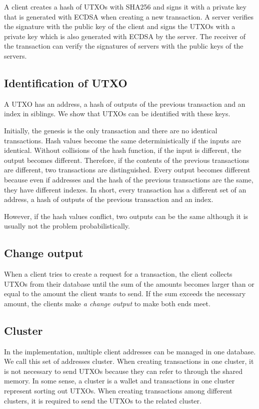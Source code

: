 \documentclass[a4paper, oneside]{discothesis}
\begin{document}
A client creates a hash of UTXOs with SHA256 and signs it with a private key
that is generated with ECDSA when creating a new transaction.
A server verifies the signature with the public key of the client
and signs the UTXOs with a private key which is also generated with ECDSA by the server.
The receiver of the transaction can verify the signatures of servers
with the public keys of the servers.

\subsection{Identification of UTXO}
A UTXO has an address, a hash of outputs of the previous transaction and an index in siblings.
We show that UTXOs can be identified with these keys.

Initially, the genesis is the only transaction and there are no identical transactions.
Hash values become the same deterministically if the inputs are identical.
Without collisions of the hash function, if the input is different, the output becomes different.
Therefore, if the contents of the previous transactions are different,
two transactions are distinguished.
Every output becomes different because even if addresses and the hash
of the previous transactions are the same, they have different indexes.
In short, every transaction has a different set of an address,
a hash of outputs of the previous transaction and an index.

However, if the hash values conflict, two outputs can be the same
although it is usually not the problem probabilistically.


\subsection{Change output}
When a client tries to create a request for a transaction,
the client collects UTXOs from their database until the sum of the amounts
becomes larger than or equal to the amount the client wants to send.
If the sum exceeds the necessary amount, the clients make \emph{a change output}
to make both ends meet.


\subsection{Cluster}
In the implementation, multiple client addresses can be managed in one database.
We call this set of addresses cluster.
When creating transactions in one cluster, it is not necessary to send UTXOs because they can refer to through the shared memory.
In some sense, a cluster is a wallet and transactions in one cluster represent sorting out UTXOs.
When creating transactions among different clusters, it is required to send the UTXOs to the related cluster.
\end{document}
